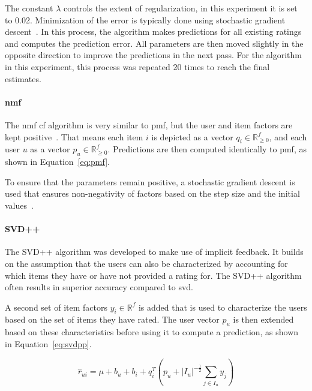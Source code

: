 The constant $\lambda$ controls the extent of regularization, in this experiment it is set to 0.02. Minimization of the error is typically done using stochastic gradient descent~\cite{Hug2020, Ricci2010}.
In this process, the algorithm makes predictions for all existing ratings and computes the prediction error.
All parameters are then moved slightly in the opposite direction to improve the predictions in the next pass.
For the algorithm in this experiment, this process was repeated 20 times to reach the final estimates.

\paragraph{\gls{nmf}}
The \gls{nmf} \gls{cf} algorithm is very similar to \gls{pmf}, but the user and item factors are kept positive~\cite{NMF:2014, NMF_algo, zhang2006learning, Hug2020}.
That means each item $i$ is depicted as a vector $q_i \in \mathbb{R}_{\geq 0}^f$, and each user $u$ as a vector $p_u \in \mathbb{R}_{\geq 0}^f$.
Predictions are then computed identically to \gls{pmf}, as shown in Equation~\ref{eq:pmf}.

To ensure that the parameters remain positive, a stochastic gradient descent is used that ensures non-negativity of factors based on the step size and the initial values~\cite{Hug2020}.

\paragraph{SVD++}
The SVD++ algorithm was developed to make use of implicit feedback.
It builds on the assumption that the users can also be characterized by accounting for which items they have or have not provided a rating for.
The SVD++ algorithm often results in superior accuracy compared to \gls{svd}.

A second set of item factors $y_i \in \mathbb{R}^f$ is added that is used to characterize the users based on the set of items they have rated.
The user vector $p_u$ is then extended based on these characteristics before using it to compute a prediction, as shown in Equation~\ref{eq:svdpp}. 

\begin{equation}
  \label{eq:svdpp}
    \hat{r}_{ui} = \mu + b_u + b_i + q_i^T\left(p_u +
        |I_u|^{-\frac{1}{2}} \sum_{j \in I_u}y_j\right)
\end{equation}

